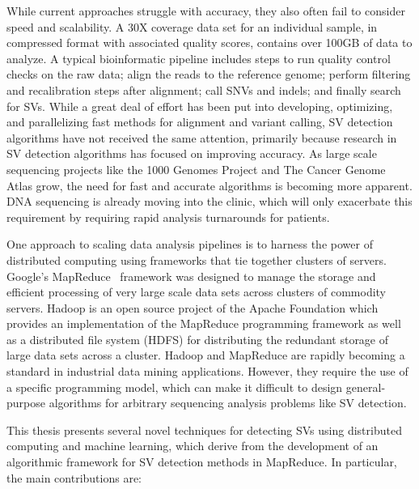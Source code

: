 While current approaches struggle with accuracy, they also often fail to consider speed and scalability. A 30X coverage data set for an individual sample, in compressed format with associated quality scores, contains over 100GB of data to analyze. A typical bioinformatic pipeline includes steps to run quality control checks on the raw data; align the reads to the reference genome; perform filtering and recalibration steps after alignment; call SNVs and indels; and finally search for SVs. While a great deal of effort has been put into developing, optimizing, and parallelizing fast methods for alignment and variant calling, SV detection algorithms have not received the same attention, primarily because research in SV detection algorithms has focused on improving accuracy. As large scale sequencing projects like the 1000 Genomes Project and The Cancer Genome Atlas grow, the need for fast and accurate algorithms is becoming more apparent. DNA sequencing is already moving into the clinic, which will only exacerbate this requirement by requiring rapid analysis turnarounds for patients.

One approach to scaling data analysis pipelines is to harness the power of distributed computing using frameworks that tie together clusters of servers. Google's MapReduce~\cite{Dean:2008p277} framework was designed to manage the storage and efficient processing of very large scale data sets across clusters of commodity servers. Hadoop is an open source project of the Apache Foundation which provides an implementation of the MapReduce programming framework as well as a distributed file system (HDFS) for distributing the redundant storage of large data sets across a cluster. Hadoop and MapReduce are rapidly becoming a standard in industrial data mining applications. However, they require the use of a specific programming model, which can make it difficult to design general-purpose algorithms for arbitrary sequencing analysis problems like SV detection. 

This thesis presents several novel techniques for detecting SVs using distributed computing and machine learning, which derive from the development of an algorithmic framework for SV detection methods in MapReduce. In particular, the main contributions are:

